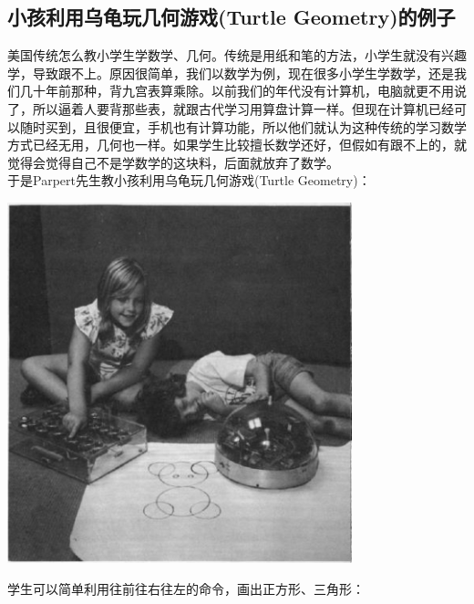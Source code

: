 \hypertarget{ux5c0fux5b69ux5229ux7528ux4e4cux9f9fux73a9ux51e0ux4f55ux6e38ux620fturtle-geometryux7684ux4f8bux5b50}{%
\subsection{小孩利用乌龟玩几何游戏(Turtle
Geometry)的例子}\label{ux5c0fux5b69ux5229ux7528ux4e4cux9f9fux73a9ux51e0ux4f55ux6e38ux620fturtle-geometryux7684ux4f8bux5b50}}

美国传统怎么教小学生学数学、几何。传统是用纸和笔的方法，小学生就没有兴趣学，导致跟不上。原因很简单，我们以数学为例，现在很多小学生学数学，还是我们几十年前那种，背九宫表算乘除。以前我们的年代没有计算机，电脑就更不用说了，所以逼着人要背那些表，就跟古代学习用算盘计算一样。但现在计算机已经可以随时买到，且很便宜，手机也有计算功能，所以他们就认为这种传统的学习数学方式已经无用，几何也一样。如果学生比较擅长数学还好，但假如有跟不上的，就觉得会觉得自己不是学数学的这块料，后面就放弃了数学。\\
于是Parpert先生教小孩利用乌龟玩几何游戏(Turtle Geometry)：


\includegraphics[width=10cm]{mindstorm_p51.jpg}

学生可以简单利用往前往右往左的命令，画出正方形、三角形：


